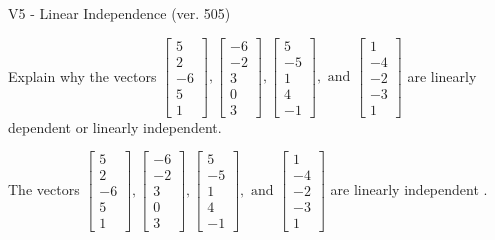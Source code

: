 \begin{exercise}
  \begin{exerciseTitle}V5 - Linear Independence (ver. 505)\end{exerciseTitle}
  \begin{exerciseStatement}
    Explain why the vectors \(\left[\begin{array}{r}
5 \\
2 \\
-6 \\
5 \\
1
\end{array}\right] , \left[\begin{array}{r}
-6 \\
-2 \\
3 \\
0 \\
3
\end{array}\right] , \left[\begin{array}{r}
5 \\
-5 \\
1 \\
4 \\
-1
\end{array}\right] , \text{ and } \left[\begin{array}{r}
1 \\
-4 \\
-2 \\
-3 \\
1
\end{array}\right]\) are linearly dependent or linearly independent.	


  \end{exerciseStatement}
  \begin{exerciseAnswer}
   The vectors \(\left[\begin{array}{r}
5 \\
2 \\
-6 \\
5 \\
1
\end{array}\right] , \left[\begin{array}{r}
-6 \\
-2 \\
3 \\
0 \\
3
\end{array}\right] , \left[\begin{array}{r}
5 \\
-5 \\
1 \\
4 \\
-1
\end{array}\right] , \text{ and } \left[\begin{array}{r}
1 \\
-4 \\
-2 \\
-3 \\
1
\end{array}\right]\) are 
  	 linearly independent  .
  


  \end{exerciseAnswer}
\end{exercise}